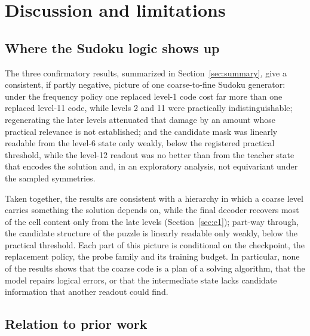 \section{Discussion and limitations}
\label{sec:discussion}

\subsection{Where the Sudoku logic shows up}
\label{sec:discussion-summary}

The three confirmatory results, summarized in Section~\ref{sec:summary}, give a consistent, if partly negative, picture of one coarse-to-fine Sudoku generator: under the frequency policy one replaced level-1 code cost far more than one replaced level-11 code, while levels 2 and 11 were practically indistinguishable; regenerating the later levels attenuated that damage by an amount whose practical relevance is not established; and the candidate mask was linearly readable from the level-6 state only weakly, below the registered practical threshold, while the level-12 readout was no better than from the teacher state that encodes the solution and, in an exploratory analysis, not equivariant under the sampled symmetries.

Taken together, the results are consistent with a hierarchy in which a coarse level carries something the solution depends on, while the final decoder recovers most of the cell content only from the late levels (Section~\ref{sec:e1}); part-way through, the candidate structure of the puzzle is linearly readable only weakly, below the practical threshold. Each part of this picture is conditional on the checkpoint, the replacement policy, the probe family and its training budget. In particular, none of the results shows that the coarse code is a plan of a solving algorithm, that the model repairs logical errors, or that the intermediate state lacks candidate information that another readout could find.

\subsection{Relation to prior work}
\label{sec:discussion-related}

